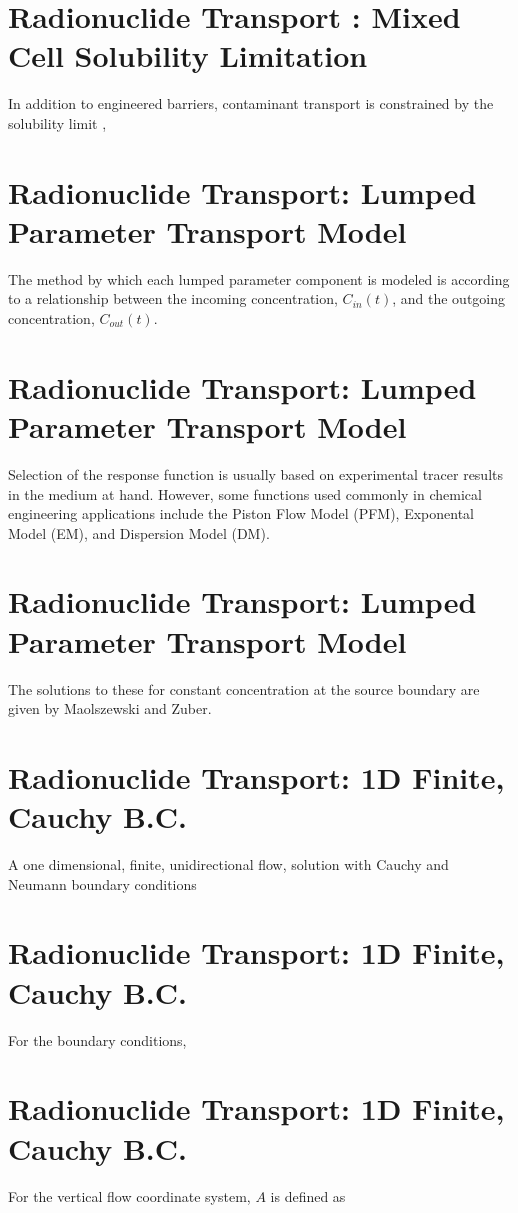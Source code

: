 \documentclass[letterpaper]{article}
\begin{document}
{  \section{Radionuclide Transport : Mixed Cell Solubility Limitation}
In addition to engineered barriers, contaminant transport is constrained by 
  the solubility limit \cite{hedin_integrated_2002}, 

  \section{Radionuclide Transport: Lumped Parameter Transport Model}
The method by which each lumped parameter component is modeled is
according to a relationship between the incoming concentration, $C_{in}(t)$,
and the outgoing concentration, $C_{out}(t)$.

  \section{Radionuclide Transport: Lumped Parameter Transport Model}
Selection of the response function is usually based on experimental tracer
results in the medium at hand. However, some functions used commonly in
chemical engineering applications \cite{maloszewski_lumped_1996} include the
Piston Flow Model (PFM), Exponental Model (EM), and Dispersion Model (DM). 

  \section{Radionuclide Transport: Lumped Parameter Transport Model}
The solutions to these for constant concentration at the 
source boundary are given by Maolszewski and Zuber.

  \section{Radionuclide Transport: 1D Finite, Cauchy B.C.}
  A one dimensional, finite, unidirectional flow,
  solution with Cauchy and Neumann boundary conditions

  \section{Radionuclide Transport: 1D Finite, Cauchy B.C.}
For the boundary conditions, 

  \section{Radionuclide Transport: 1D Finite, Cauchy B.C.}
For the vertical flow coordinate system, $A$ is defined as

}
\end{document}
